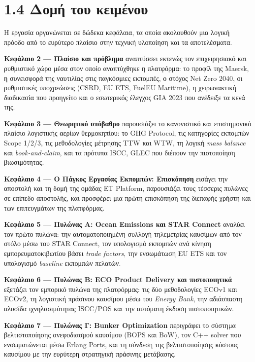 \section{1.4 Δομή του
κειμένου}\label{ux3b4ux3bfux3bcux3ae-ux3c4ux3bfux3c5-ux3baux3b5ux3b9ux3bcux3adux3bdux3bfux3c5}

Η εργασία οργανώνεται σε δώδεκα κεφάλαια, τα οποία ακολουθούν μια λογική
πρόοδο από το ευρύτερο πλαίσιο στην τεχνική υλοποίηση και τα
αποτελέσματα.

\textbf{Κεφάλαιο 2 --- Πλαίσιο και πρόβλημα} αναπτύσσει εκτενώς τον
επιχειρησιακό και ρυθμιστικό χώρο μέσα στον οποίο αναπτύχθηκε η
πλατφόρμα: το προφίλ της Maersk, η συνεισφορά της ναυτιλίας στις
παγκόσμιες εκπομπές, ο στόχος Net Zero 2040, οι ρυθμιστικές υποχρεώσεις
(CSRD, EU ETS, FuelEU Maritime), η χειρωνακτική διαδικασία που προηγείτο
και ο εσωτερικός έλεγχος GIA 2023 που ανέδειξε τα κενά της.

\textbf{Κεφάλαιο 3 --- Θεωρητικό υπόβαθρο} παρουσιάζει το κανονιστικό
και επιστημονικό πλαίσιο λογιστικής αερίων θερμοκηπίου: το GHG Protocol,
τις κατηγορίες εκπομπών Scope 1/2/3, τις μεθοδολογίες μέτρησης TTW και
WTW, τη λογική \emph{mass balance} και \emph{book-and-claim}, και τα
πρότυπα ISCC, GLEC που διέπουν την πιστοποίηση βιωσιμότητας.

\textbf{Κεφάλαιο 4 --- Ο Πάγκος Εργασίας Εκπομπών: Επισκόπηση} εισάγει
την αποστολή και τη δομή της ομάδας ET Platform, παρουσιάζει τους
τέσσερις πυλώνες σε επίπεδο αποστολής, και προσφέρει μια πρώτη
επισκόπηση της διεπαφής χρήστη και των επιτευγμάτων της πλατφόρμας.

\textbf{Κεφάλαιο 5 --- Πυλώνας Α: Ocean Emissions και STAR Connect}
αναλύει τον πρώτο πυλώνα: την αυτοματοποιημένη συλλογή τηλεμετρίας
καυσίμων από τον στόλο μέσω του STAR Connect, τον υπολογισμό εκπομπών
ανά κίνηση εμπορευματοκιβωτίου βάσει \emph{trade factors}, την
ενσωμάτωση EU ETS και τον υπολογισμό \emph{baseline} εκπομπών πελατών.

\textbf{Κεφάλαιο 6 --- Πυλώνας Β: ECO Product Delivery και
πιστοποιητικά} εξετάζει τον εμπορικό πυλώνα της πλατφόρμας: τις δύο
μεθοδολογίες ECOv1 και ECOv2, τη λογιστική πράσινου καυσίμου μέσω του
\emph{Energy Bank}, την αδιάσπαστη αλυσίδα ιχνηλασιμότητας ISCC/POS και
την αυτόματη έκδοση πιστοποιητικών.

\textbf{Κεφάλαιο 7 --- Πυλώνας Γ: Bunker Optimization} περιγράφει το
σύστημα βελτιστοποίησης ανεφοδιασμού καυσίμου (BOPS και BoW), τον C++
solver που ενσωματώνεται μέσω Erlang Ports, και τη σύνδεση της
βελτιστοποίησης κόστους καυσίμου με την ευρύτερη στρατηγική πράσινης
μετάβασης.

